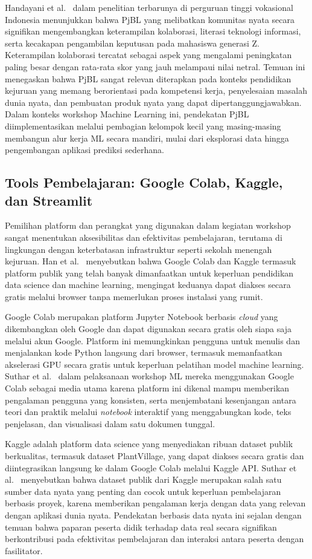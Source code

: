 Handayani et al.\ \cite{Handayani2026} dalam penelitian terbarunya di perguruan tinggi vokasional Indonesia menunjukkan bahwa PjBL yang melibatkan komunitas nyata secara signifikan mengembangkan keterampilan kolaborasi, literasi teknologi informasi, serta kecakapan pengambilan keputusan pada mahasiswa generasi Z. Keterampilan kolaborasi tercatat sebagai aspek yang mengalami peningkatan paling besar dengan rata-rata skor yang jauh melampaui nilai netral. Temuan ini menegaskan bahwa PjBL sangat relevan diterapkan pada konteks pendidikan kejuruan yang memang berorientasi pada kompetensi kerja, penyelesaian masalah dunia nyata, dan pembuatan produk nyata yang dapat dipertanggungjawabkan. Dalam konteks workshop Machine Learning ini, pendekatan PjBL diimplementasikan melalui pembagian kelompok kecil yang masing-masing membangun alur kerja ML secara mandiri, mulai dari eksplorasi data hingga pengembangan aplikasi prediksi sederhana.

\subsection{Tools Pembelajaran: Google Colab, Kaggle, dan Streamlit}
Pemilihan platform dan perangkat yang digunakan dalam kegiatan workshop sangat menentukan aksesibilitas dan efektivitas pembelajaran, terutama di lingkungan dengan keterbatasan infrastruktur seperti sekolah menengah kejuruan. Han et al.\ \cite{Han2022} menyebutkan bahwa Google Colab dan Kaggle termasuk platform publik yang telah banyak dimanfaatkan untuk keperluan pendidikan data science dan machine learning, mengingat keduanya dapat diakses secara gratis melalui browser tanpa memerlukan proses instalasi yang rumit.

Google Colab merupakan platform Jupyter Notebook berbasis \textit{cloud} yang dikembangkan oleh Google dan dapat digunakan secara gratis oleh siapa saja melalui akun Google. Platform ini memungkinkan pengguna untuk menulis dan menjalankan kode Python langsung dari browser, termasuk memanfaatkan akselerasi GPU secara gratis untuk keperluan pelatihan model machine learning. Suthar et al.\ \cite{Suthar2022} dalam pelaksanaan workshop ML mereka menggunakan Google Colab sebagai media utama karena platform ini dikenal mampu memberikan pengalaman pengguna yang konsisten, serta menjembatani kesenjangan antara teori dan praktik melalui \textit{notebook} interaktif yang menggabungkan kode, teks penjelasan, dan visualisasi dalam satu dokumen tunggal.

Kaggle adalah platform data science yang menyediakan ribuan dataset publik berkualitas, termasuk dataset PlantVillage, yang dapat diakses secara gratis dan diintegrasikan langsung ke dalam Google Colab melalui Kaggle API. Suthar et al.\ \cite{Suthar2022} menyebutkan bahwa dataset publik dari Kaggle merupakan salah satu sumber data nyata yang penting dan cocok untuk keperluan pembelajaran berbasis proyek, karena memberikan pengalaman kerja dengan data yang relevan dengan aplikasi dunia nyata. Pendekatan berbasis data nyata ini sejalan dengan temuan bahwa paparan peserta didik terhadap data real secara signifikan berkontribusi pada efektivitas pembelajaran dan interaksi antara peserta dengan fasilitator.


